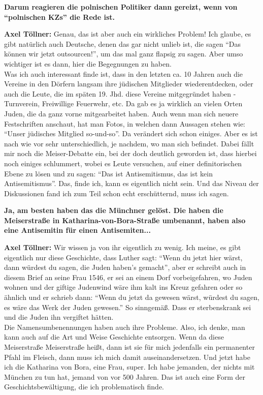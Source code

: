 \textbf{Darum reagieren die polnischen Politiker dann gereizt, wenn von "`polnischen KZs"' die Rede ist.} 

\textbf{Axel Töllner:} Genau, das ist aber auch ein wirkliches Problem! Ich glaube, es gibt natürlich auch Deutsche, denen das gar nicht unlieb ist, die sagen "`Das können wir jetzt outsourcen!"', um das mal ganz flapsig zu sagen. Aber umso wichtiger ist es dann, hier die Begegnungen zu haben.\\
Was ich auch interessant finde ist, dass in den letzten ca. 10 Jahren auch die Vereine in den Dörfern langsam ihre jüdischen Mitglieder wiederentdecken, oder auch die Leute, die im späten 19. Jhd. diese Vereine mitgegründet haben - Turnverein, Freiwillige Feuerwehr, etc. Da gab es ja wirklich an vielen Orten Juden, die da ganz vorne mitgearbeitet haben. Auch wenn man sich neuere Festschriften anschaut, hat man Fotos, in welchen dann Aussagen stehen wie: "`Unser jüdisches Mitglied so-und-so"'. Da verändert sich schon einiges. Aber es ist nach wie vor sehr unterschiedlich, je nachdem, wo man sich befindet. 
Dabei fällt mir noch die Meiser-Debatte ein, bei der doch deutlich geworden ist, dass hierbei noch einiges schlummert, wobei es Leute versuchen, auf einer definitorischen Ebene zu lösen und zu sagen: "`Das ist Antisemitismus, das ist kein Antisemitismus"'. Das, finde ich, kann es eigentlich nicht sein. Und das Niveau der Diskussionen fand ich zum Teil schon echt erschütternd, muss ich sagen. 

\textbf{Ja, am besten haben das die Münchner gelöst. Die haben die Meiserstraße in Katharina-von-Bora-Straße umbenannt, haben also eine Antisemitin für einen Antisemiten...} 

 \textbf{Axel Töllner:} Wir wissen ja von ihr eigentlich zu wenig. Ich meine, es gibt eigentlich nur diese Geschichte, dass Luther sagt: "`Wenn du jetzt hier wärst, dann würdest du sagen, die Juden haben's gemacht"', aber er schreibt auch in diesem Brief an seine Frau 1546, er sei an einem Dorf vorbeigefahren, wo Juden wohnen und der giftige Judenwind wäre ihm kalt ins Kreuz gefahren oder so ähnlich und er schrieb dann: "`Wenn du jetzt da gewesen wärst, würdest du sagen, es wäre das Werk der Juden gewesen."' So sinngemäß. Dass er sterbenskrank sei und die Juden ihn vergiftet hätten.\\
Die Namensumbenennungen haben auch ihre Probleme. Also, ich denke, man kann auch auf die Art und Weise Geschichte entsorgen. Wenn da diese Meiserstraße Meiserstraße heißt, dann ist sie für mich jedenfalls ein permanenter Pfahl im Fleisch, dann muss ich mich damit auseinandersetzen. Und jetzt habe ich die Katharina von Bora, eine Frau, super. Ich habe jemanden, der nichts mit München zu tun hat, jemand von vor 500 Jahren. Das ist auch eine Form der Geschichtsbewältigung, die ich problematisch finde. 

